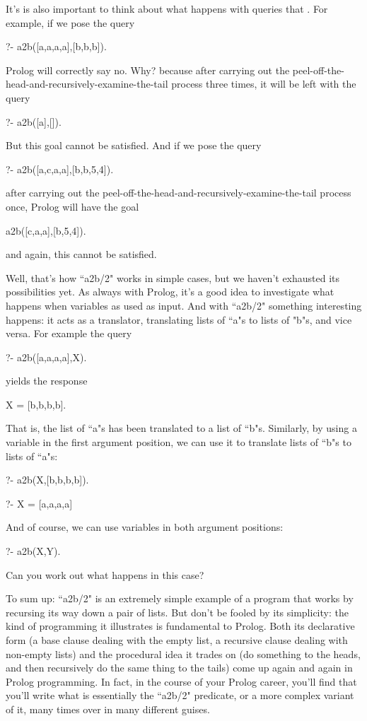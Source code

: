 It's is also important to think about what  happens with queries
that . For example, if we pose the query
\begin{LPNcodedisplay}
?- a2b([a,a,a,a],[b,b,b]).
\end{LPNcodedisplay}
Prolog will correctly say no. Why? because after carrying out the
peel-off-the-head-and-recursively-examine-the-tail process three
times, it will be left with the query
\begin{LPNcodedisplay}
?- a2b([a],[]).
\end{LPNcodedisplay}
But this goal cannot be satisfied.
And if we pose the query
\begin{LPNcodedisplay}
?- a2b([a,c,a,a],[b,b,5,4]).
\end{LPNcodedisplay}
after carrying out the
peel-off-the-head-and-recursively-examine-the-tail process once,
Prolog will have the goal
\begin{LPNcodedisplay}
a2b([c,a,a],[b,5,4]).
\end{LPNcodedisplay}
and again, this cannot be satisfied.

Well, that's how ``a2b/2" works in simple cases, but we
haven't exhausted its possibilities yet. As always with Prolog, it's a
good idea to investigate what happens when variables as used as
input. And with ``a2b/2" something interesting happens: it
acts as a translator, translating lists of ``a"s to lists of
"b"s, and vice versa.  For example the query
\begin{LPNcodedisplay}
?- a2b([a,a,a,a],X).
\end{LPNcodedisplay}
yields the response
\begin{LPNcodedisplay}
X = [b,b,b,b].
\end{LPNcodedisplay}
That is, the list of ``a"s has been translated to a list of
``b"s. Similarly, by using a variable in the first argument
position, we can use it to translate lists of ``b"s
to lists of ``a"s:
\begin{LPNcodedisplay}
?- a2b(X,[b,b,b,b]).

?- X = [a,a,a,a]
\end{LPNcodedisplay}

And of course, we can use variables in both argument positions:
\begin{LPNcodedisplay}
?- a2b(X,Y).
\end{LPNcodedisplay}
Can you work out what happens in this case?

To sum up: ``a2b/2" is an extremely simple example of a
program that works by recursing its way down a pair of lists. But
don't be fooled by its simplicity: the kind of programming it
illustrates is fundamental to Prolog.  Both its declarative form (a
base clause dealing with the empty list, a recursive clause dealing
with non-empty lists) and the procedural idea it trades on (do
something to the heads, and then recursively do the same thing to the
tails) come up again and again in Prolog programming. In fact, in the
course of your Prolog career, you'll find that you'll write what is
essentially the ``a2b/2" predicate, or a more complex
variant of it, many times over in many different guises.

